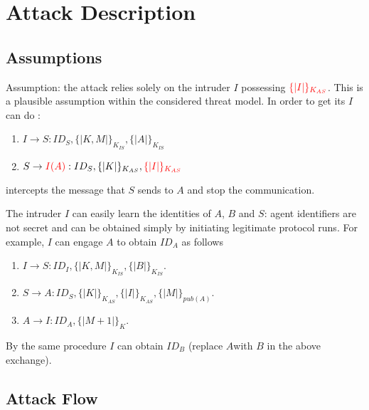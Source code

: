 \documentclass[11pt]{article}
\begin{document}
    \section{Attack Description}
    \subsection{Assumptions}
    \label{sec:assumptions}
    Assumption: the attack relies solely on the intruder $I$ possessing $\textcolor{red}{\{|I|\}_{K_{AS}}}$. This is a plausible
    assumption within the considered threat model. In order to get its $I$ can do :
    \begin{enumerate}
        \item $I \rightarrow S: ID_S, \{| K, M |\}_{K_{IS}}, \{|A|\}_{K_{IS}}$
        \item $S \rightarrow \textcolor{red}{I(A)} : ID_S,\{| K|\}_{K_{AS}}, \textcolor{red}{\{|I|\}_{K_{AS}}}$
    \end{enumerate}
    intercepts the message that $S$ sends to $A$ and stop the communication.

    The intruder $I$ can easily learn the identities of $A$, $B$ and $S$: agent identifiers are not secret and can be
    obtained simply by initiating legitimate protocol runs. For example, $I$ can engage $A$ to obtain $ID_A$ as follows


\begin{enumerate}
    \item $I \rightarrow S: ID_I, \{|K,M|\}_{K_{IS}}, \{|B|\}_{K_{IS}}$.
    \item $S \rightarrow A: ID_S, \{|K|\}_{K_{AS}}, \{|I|\}_{K_{AS}}, \{|M|\}_{pub(A)}$.
    \item $A \rightarrow I: ID_A, \{|M+1|\}_K$.
\end{enumerate}

By the same procedure $I$ can obtain $ID_B$ (replace $A$with $B$ in the above exchange).





    \subsection{Attack Flow}
\end{document}
